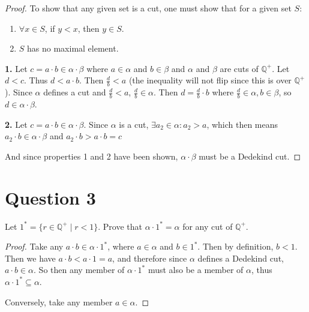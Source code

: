 \documentclass[12pt, letterpaper]{article}
\begin{document}
\begin{proof}

\noindent To show that any given set is a cut, one must show that for a given set $S$:
\begin{enumerate}
  \item $\forall x \in S$, if $y < x$, then $y \in S$.
  \item $S$ has no maximal element.
\end{enumerate}

\noindent\textbf{1.} Let $c = a \cdot b \in \alpha \cdot \beta$ where $a \in \alpha$ and $b \in \beta$ and $\alpha$ and $\beta$ are cuts of $\mathbb{Q}^+$. Let $d < c$. Thus $d < a \cdot b$. Then $\frac{d}{b} < a$ (the inequality will not flip since this is over $\mathbb{Q}^+$).
Since $\alpha$ defines a cut and $\frac{d}{b} < a$, $\frac{d}{b} \in \alpha$. Then $d = \frac{d}{b} \cdot b$ where $\frac{d}{b} \in \alpha, b \in \beta$, so $d \in \alpha \cdot \beta$.

\noindent\textbf{2.} Let $c = a \cdot b \in \alpha \cdot \beta$. Since $\alpha$ is a cut, $\exists a_2 \in \alpha: a_2 > a$,
 which then means $a_2 \cdot b \in \alpha \cdot \beta$ and $ a_2 \cdot b > a \cdot b = c$

\noindent And since properties 1 and 2 have been shown, $\alpha \cdot \beta$ must be a Dedekind cut.
\end{proof}
\pagebreak
\section{Question 3}
Let $1^* = \{ r \in \mathbb{Q}^+ \mid r < 1 \}$. Prove that $\alpha \cdot 1^* = \alpha$ for any cut of $\mathbb{Q}^+$.

\begin{proof}

\noindent Take any $a \cdot b \in \alpha \cdot 1^*$, where $a \in \alpha$ and $b \in 1^*$. Then by definition, $b < 1$. Then we have $a \cdot b < a \cdot 1 = a$,
and therefore since $\alpha$ defines a Dedekind cut, $a \cdot b \in \alpha$. So then any member of $\alpha \cdot 1^*$ must also be a member of $\alpha$, thus
$\alpha \cdot 1^* \subseteq \alpha$.

\noindent Conversely, take any member $a \in \alpha$.

\end{proof}
\end{document}
